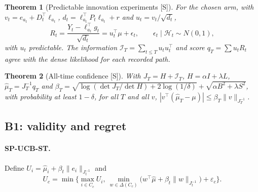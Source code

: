 \documentclass[11pt]{article}
\newtheorem{theorem}{Theorem}
\theoremstyle{definition}
\theoremstyle{remark}
\newcommand{\I}{\mathcal{I}}
\newcommand{\src}[1]{\textsf{[#1]}}
\begin{document}
\begin{theorem}[Predictable innovation experiments \src{S}]\label{thm:innov}
For the chosen arm, with $v_t=e_{a_t}+D_t^\top\ell_{a_t}$, $d_t=\ell_{a_t}^\top P_t\ell_{a_t}+r$ and $u_t=v_t/\sqrt{d_t}$,
\[
R_t=\frac{Y_t-\ell_{a_t}^\top g_t}{\sqrt{d_t}}=u_t^\top\mu+\epsilon_t,\qquad \epsilon_t\mid\mathcal H_t\sim N(0,1),
\]
with $u_t$ predictable. The information $\I_T=\sum_{t\le T}u_tu_t^\top$ and score $q_T=\sum u_tR_t$ agree with the dense likelihood for each recorded path.
\end{theorem}

\begin{theorem}[All-time confidence \src{S}]\label{thm:alltime}
With $J_T=H+\I_T$, $H=\alpha I+\lambda L$, $\hat\mu_T=J_T^{-1}q_T$ and
$\beta_T=\sqrt{\log(\det J_T/\det H)+2\log(1/\delta)}+\sqrt{\alpha B^2+\lambda S^2}$, with probability at least $1-\delta$, for all $T$ and all $v$,
$|v^\top(\hat\mu_T-\mu)|\le\beta_T\|v\|_{J_T^{-1}}$.
\end{theorem}

\subsection{B1: validity and regret}

\paragraph{SP-UCB-ST.} Define $U_i=\hat\mu_i+\beta_t\|e_i\|_{J_t^{-1}}$ and
\[
U_c=\min\Big\{\max_{i\in C_c}U_i,\ \min_{w\in\Delta(C_c)}\big(w^\top\hat\mu+\beta_t\|w\|_{J_t^{-1}}\big)+\varepsilon_c\Big\}.
\]
\end{document}
